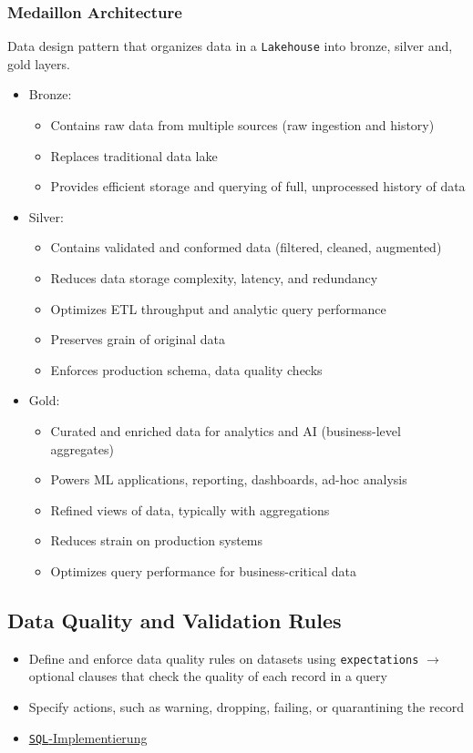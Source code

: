 \documentclass[11pt]{scrartcl}
\begin{document}
\subsubsection{Medaillon Architecture} \label{medaillon}
Data design pattern that organizes data in a \texttt{Lakehouse} into bronze, silver and, gold layers.
\begin{itemize}
	\item Bronze:
	\begin{itemize}
		\item Contains raw data from multiple sources (raw ingestion and history)
		\item Replaces traditional data lake
		\item Provides efficient storage and querying of full, unprocessed history of data
	\end{itemize}
	\item Silver: 
	\begin{itemize}
		\item Contains validated and conformed data (filtered, cleaned, augmented)
		\item Reduces data storage complexity, latency, and redundancy
		\item Optimizes ETL throughput and analytic query performance
		\item Preserves grain of original data
		\item Enforces production schema, data quality checks
	\end{itemize}
	\item Gold: 
	\begin{itemize}
		\item Curated and enriched data for analytics and AI (business-level aggregates)
		\item Powers ML applications, reporting, dashboards, ad-hoc analysis
		\item Refined views of data, typically with aggregations
		\item Reduces strain on production systems
		\item Optimizes query performance for business-critical data
	\end{itemize}
\end{itemize}


\subsection{Data Quality and Validation Rules} \label{data_quality}
\begin{itemize}
	\item Define and enforce data quality rules on datasets using \texttt{expectations} $\to$ optional clauses that check the quality of each record in a query
	\item Specify actions, such as warning, dropping, failing, or quarantining the record
	\item \hyperref[delta_live_sql]{\texttt{SQL}-Implementierung}
\end{itemize}
\end{document}
